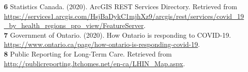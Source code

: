 \documentclass{article}
\begin{document}
\textbf{6} Statistics Canada. (2020). ArcGIS REST Services Directory. Retrieved from \href{https://services1.arcgis.com/HsjBaDykC1mjhXz9/arcgis/rest/services/covid_19_by_health_regions_pro_view/FeatureServer}{https://services1.arcgis.com/HsjBaDykC1mjhXz9/arcgis/rest/services/covid\_19\_by\_health\_regions\_pro\_view/FeatureServer}.\\

\textbf{7} Government of Ontario. (2020). How Ontario is responding to COVID-19. \href{https://www.ontario.ca/page/how-ontario-is-responding-covid-19}{https://www.ontario.ca/page/how-ontario-is-responding-covid-19}.\\

\textbf{8} Public Reporting for Long-Term Care. Retrieved from \href{http://publicreporting.ltchomes.net/en-ca/LHIN_Map.aspx}{http://publicreporting.ltchomes.net/en-ca/LHIN_Map.aspx}. \\



\end{document}
